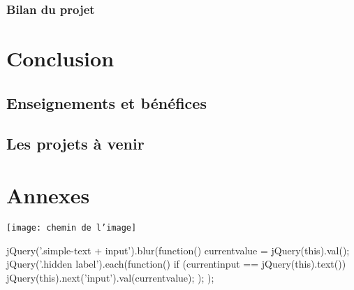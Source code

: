 \documentclass[a4paper,11pt,twoside]{report}
\begin{document}
    \subsection*{Bilan du projet}
    

\chapter{Conclusion}
  \section{Enseignements et bénéfices}
  \section{Les projets à venir}

\chapter*{Annexes}

\listoffigures



\texttt{[image: chemin de l'image]}

\begin{verbatimtab}[4] 
jQuery('.simple-text + input').blur(function(){
            currentvalue = jQuery(this).val();
            jQuery('.hidden label').each(function() {
                if (currentinput == jQuery(this).text()) {
                    jQuery(this).next('input').val(currentvalue);
                }
            });
        });
\end{verbatimtab}
\end{document}
